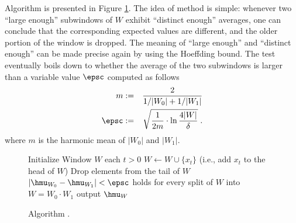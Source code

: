 
Algorithm \adwin is presented in Figure \ref{blnAlgorithm}. 
The idea of \adwin method is simple: whenever two ``large enough'' 
subwindows of $W$ exhibit ``distinct enough'' averages, 
one can conclude that the corresponding expected values
are different, and the older portion of the window is dropped.
The meaning of ``large enough'' and ``distinct enough''
can be made precise again by using the Hoeffding bound. The 
test eventually boils down to whether the average of the two subwindows
is larger than a variable value $\epsc$ 
computed as follows
%
\begin{eqnarray*}
m &:=& \frac{2}{1/|W_0| +1/|W_1|}\\ %
\epsc &:=& \sqrt{ \frac{1}{2m} \cdot \ln\frac{4|W|}{\delta}} \;.
\end{eqnarray*}
where $m$ is the harmonic mean of $|W_0|$ and $|W_1|$.

\begin{figure}

\centering

\begin{codebox}
\li Initialize Window $W$
\li \For each $t >0$ %
\li \Do $W \gets W \cup \{x_t\}$ (i.e., add $x_t$ to the head of $W$)
\li \Repeat Drop elements from the tail of $W$ 
\li \Until $|\hmu_{W_0}-\hmu_{W_1}| < \epsc$ holds
\li \quad\quad for every split of $W$ into $W=W_0 \cdot W_1$ 
\li output $\hmu_{W}$ %
\end{codebox}
\caption{Algorithm \adwinb.}\label{blnAlgorithm}
\end{figure}

